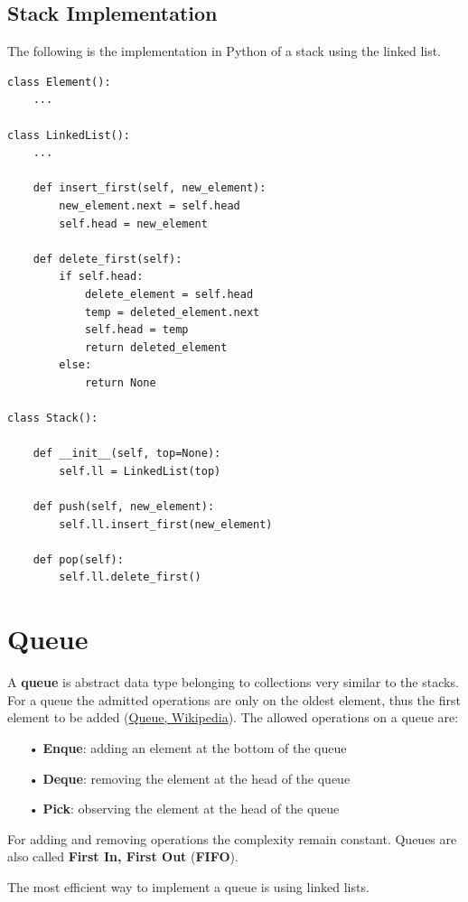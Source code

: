\subsection{Stack Implementation}
The following is the implementation in Python of a stack using the linked list.
\begin{lstlisting}[firstnumber=1, caption={Stack implementation.}]
class Element():
	...

class LinkedList():
	...
	
	def insert_first(self, new_element):
		new_element.next = self.head
		self.head = new_element
	
	def delete_first(self):
		if self.head:
			delete_element = self.head
			temp = deleted_element.next
			self.head = temp
			return deleted_element
		else:
			return None

class Stack():
	
	def __init__(self, top=None):
		self.ll = LinkedList(top)
		
	def push(self, new_element):
		self.ll.insert_first(new_element)
	
	def pop(self):
		self.ll.delete_first()
\end{lstlisting}

\section{Queue}
\label{queue}
A \textbf{queue} is abstract data type belonging to collections very similar to the stacks. For a queue the admitted operations are only on the oldest element, thus the first element to be added \cite{wikiqueue} (\href{https://en.wikipedia.org/wiki/Queue_(abstract_data_type)}{Queue, Wikipedia}). The allowed operations on a queue are:
\begin{itemize}
\item[•] \textbf{Enque}: adding an element at the bottom of the queue
\item[•] \textbf{Deque}: removing the element at the head of the queue
\item[•] \textbf{Pick}: observing the element at the head of the queue
\end{itemize}
For adding and removing operations the complexity remain constant. Queues are also called \textbf{First In, First Out} (\textbf{FIFO}). 

The most efficient way to implement a queue is using linked lists.

